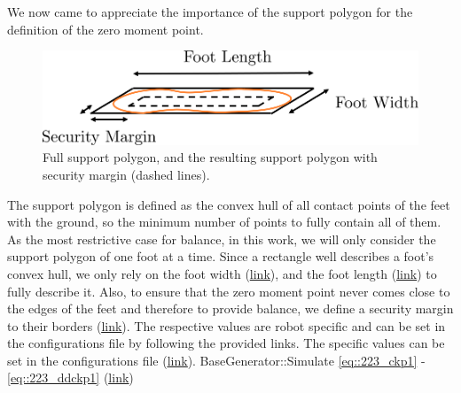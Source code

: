 We now came to appreciate the importance of the support polygon for the definition of the zero moment point. 
\begin{figure}[h!]
	\centering
	\includegraphics[scale=.5]{chapters/02_foundations_for_humanoid_walking/img/support_polygon.png}
	\caption{Full support polygon, and the resulting support polygon with security margin (dashed lines).}
	\label{fig::21_support_polygon}
\end{figure}
The support polygon is defined as the convex hull of all contact points of the feet with the ground, so the minimum number of points to fully contain all of them. As the most restrictive case for balance, in this work, we will only consider the support polygon of one foot at a time. Since a rectangle well describes a foot's convex hull, we only rely on the foot width (\href{https://github.com/mhubii/nmpc_pattern_generator/blob/bc79a6d4f9bcfd3794146355af44429f5b7a9fe0/libs/pattern_generator/configs.yaml#L14}{\underline{link}}), and the foot length (\href{https://github.com/mhubii/nmpc_pattern_generator/blob/bc79a6d4f9bcfd3794146355af44429f5b7a9fe0/libs/pattern_generator/configs.yaml#L15}{\underline{link}}) to fully describe it. Also, to ensure that the zero moment point never comes close to the edges of the feet and therefore to provide balance, we define a security margin to their borders (\href{https://github.com/mhubii/nmpc_pattern_generator/blob/bc79a6d4f9bcfd3794146355af44429f5b7a9fe0/libs/pattern_generator/configs.yaml#L3}{\underline{link}}). The respective values are robot specific and can be set in the configurations file by following the provided links.
The specific values can be set in the configurations file (\href{https://github.com/mhubii/nmpc_pattern_generator/blob/bc79a6d4f9bcfd3794146355af44429f5b7a9fe0/libs/pattern_generator/configs.yaml#L27}{\underline{link}}).
BaseGenerator::Simulate \ref{eq::223_ckp1} - \ref{eq::223_ddckp1}
(\href{https://github.com/mhubii/nmpc_pattern_generator/blob/5a213044c927dc6aac9f7e32ce1e5fb472cd67bb/libs/pattern_generator/src/base_generator.cpp#L887}{\underline{link}})
